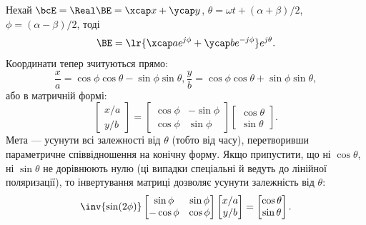 Нехай \(\bcE = \Real \BE = \xcap x + \ycap y\), \(\theta = \omega t + (\alpha + \beta)/2\), \(\phi = (\alpha - \beta)/2\), тоді
\begin{equation}\label{eqn:polarizationReview:40}
\BE
= \lr{\xcap a e^{j \phi} + \ycap b e^{-j \phi}} e^{j \theta}.
\end{equation}
Координати тепер зчитуються прямо:
\begin{subequations}
\label{eqn:polarizationReview:50}
\begin{equation}\label{eqn:polarizationReview:60}
\frac{x}{a} = \cos\phi \cos\theta - \sin\phi \sin\theta,
\end{equation}
\begin{equation}\label{eqn:polarizationReview:80}
\frac{y}{b} = \cos\phi \cos\theta + \sin\phi \sin\theta,
\end{equation}
\end{subequations}
або в матричній формі:
\begin{equation}\label{eqn:polarizationReview:100}
\begin{bmatrix}
x/a \\
y/b
\end{bmatrix}
=
\begin{bmatrix}
\cos\phi & -\sin\phi \\
\cos\phi & \sin\phi
\end{bmatrix}
\begin{bmatrix}
\cos\theta \\
\sin\theta
\end{bmatrix}.
\end{equation}
Мета — усунути всі залежності від \(\theta\) (тобто від часу), перетворивши параметричне співвідношення на конічну форму.
Якщо припустити, що ні \(\cos\theta\), ні \(\sin\theta\) не дорівнюють нулю (ці випадки спеціальні й ведуть до лінійної поляризації), то інвертування матриці дозволяє усунути залежність від \(\theta\):
\begin{equation}\label{eqn:polarizationReview:120}
\inv{\sin(2\phi)}
\begin{bmatrix}
\sin\phi & \sin\phi \\
-\cos\phi & \cos\phi
\end{bmatrix}
\begin{bmatrix}
x/a \\
y/b
\end{bmatrix}
=
\begin{bmatrix}
\cos\theta \\
\sin\theta
\end{bmatrix}.
\end{equation}

